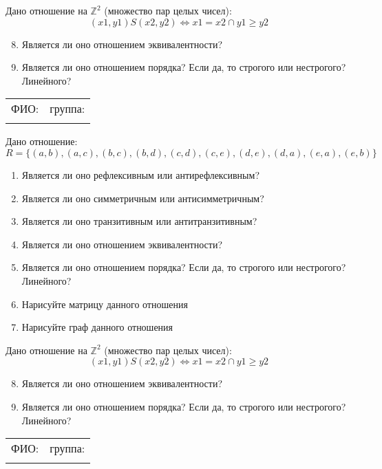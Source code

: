 \documentclass[russian,12pt]{article}
\begin{document}
Дано отношение на $\mathbb{Z}^2$ (множество пар целых чисел):
$$(x1, y1)S(x2, y2) \iff x1 = x2 \cap y1 \ge y2$$
\begin{enumerate}
\setcounter{enumi}{7}
\item Является ли оно отношением эквивалентности?
\item Является ли оно отношением порядка? Если да, то строгого или нестрогого? Линейного?
\end{enumerate}
\newpage
\thispagestyle{empty}
\begin{tabular}{|p{}|p{}|}
\hline
ФИО: & группа: \\
 & \\ \hline
\end{tabular}

\vspace{12pt}

Дано отношение:
$$R = \{(a, b), (a, c), (b, c), (b, d), (c, d), (c, e), (d, e), (d, a), (e, a), (e, b)\}$$
\begin{enumerate}
\item Является ли оно рефлексивным или антирефлексивным?
\item Является ли оно симметричным или антисимметричным?
\item Является ли оно транзитивным или антитранзитивным?
\item Является ли оно отношением эквивалентности?
\item Является ли оно отношением порядка? Если да, то строгого или нестрогого? Линейного?
\item Нарисуйте матрицу данного отношения
\item Нарисуйте граф данного отношения
\end{enumerate}

Дано отношение на $\mathbb{Z}^2$ (множество пар целых чисел):
$$(x1, y1)S(x2, y2) \iff x1 = x2 \cap y1 \ge y2$$
\begin{enumerate}
\setcounter{enumi}{7}
\item Является ли оно отношением эквивалентности?
\item Является ли оно отношением порядка? Если да, то строгого или нестрогого? Линейного?
\end{enumerate}
\newpage
\thispagestyle{empty}
\begin{tabular}{|p{}|p{}|}
\hline
ФИО: & группа: \\
 & \\ \hline
\end{tabular}
\end{document}
